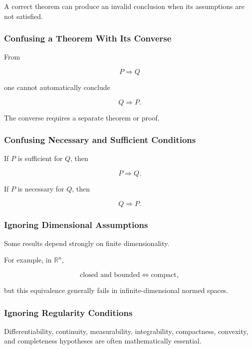 A correct theorem can produce an invalid conclusion when its assumptions are
not satisfied.

\subsubsection{Confusing a Theorem With Its Converse}

From

\[
P\Rightarrow Q
\]

one cannot automatically conclude

\[
Q\Rightarrow P.
\]

The converse requires a separate theorem or proof.

\subsubsection{Confusing Necessary and Sufficient Conditions}

If \(P\) is sufficient for \(Q\), then

\[
P\Rightarrow Q.
\]

If \(P\) is necessary for \(Q\), then

\[
Q\Rightarrow P.
\]

\subsubsection{Ignoring Dimensional Assumptions}

Some results depend strongly on finite dimensionality.

For example, in \(\mathbb{R}^n\),

\[
\boxed{
\text{closed and bounded}
\iff
\text{compact},
}
\]

but this equivalence generally fails in infinite-dimensional normed spaces.

\subsubsection{Ignoring Regularity Conditions}

Differentiability, continuity, measurability, integrability, compactness,
convexity, and completeness hypotheses are often mathematically essential.

